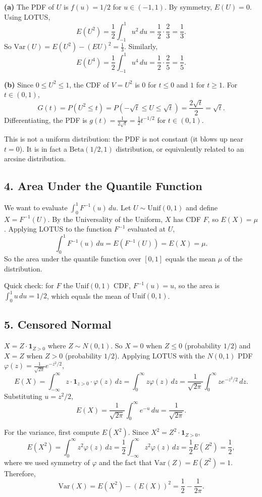 \documentclass{article}
\begin{document}
\textbf{(a)} The PDF of $U$ is $f(u)=1/2$ for $u\in(-1,1)$. By symmetry, $E(U)=0$. Using LOTUS,
$$
E(U^2)=\frac{1}{2}\int_{-1}^{1}u^2\,du=\frac{1}{2}\cdot\frac{2}{3}=\frac{1}{3}.
$$
So $\text{Var}(U)=E(U^2)-(EU)^2=\frac{1}{3}$. Similarly,
$$
E(U^4)=\frac{1}{2}\int_{-1}^{1}u^4\,du=\frac{1}{2}\cdot\frac{2}{5}=\frac{1}{5}.
$$

\textbf{(b)} Since $0\le U^2\le1$, the CDF of $V=U^2$ is $0$ for $t\le0$ and $1$ for $t\ge1$. For $t\in(0,1)$,
$$
G(t)=P(U^2\le t)=P(-\sqrt{t}\le U\le\sqrt{t})=\frac{2\sqrt{t}}{2}=\sqrt{t}.
$$
Differentiating, the PDF is $g(t)=\frac{1}{2\sqrt{t}}=\frac{1}{2}t^{-1/2}$ for $t\in(0,1)$.

This is not a uniform distribution: the PDF is not constant (it blows up near $t=0$). It is in fact a $\text{Beta}(1/2,1)$ distribution, or equivalently related to an arcsine distribution.

\subsection*{4. Area Under the Quantile Function}

We want to evaluate $\int_0^1 F^{-1}(u)\,du$. Let $U\sim\text{Unif}(0,1)$ and define $X=F^{-1}(U)$. By the Universality of the Uniform, $X$ has CDF $F$, so $E(X)=\mu$. Applying LOTUS to the function $F^{-1}$ evaluated at $U$,
$$
\int_0^1 F^{-1}(u)\,du = E(F^{-1}(U)) = E(X) = \mu.
$$
So the area under the quantile function over $[0,1]$ equals the mean $\mu$ of the distribution.

Quick check: for $F$ the $\text{Unif}(0,1)$ CDF, $F^{-1}(u)=u$, so the area is $\int_0^1 u\,du=1/2$, which equals the mean of $\text{Unif}(0,1)$.

\subsection*{5. Censored Normal}

$X = Z\cdot\mathbf{1}_{Z>0}$ where $Z\sim N(0,1)$. So $X=0$ when $Z\le0$ (probability $1/2$) and $X=Z$ when $Z>0$ (probability $1/2$). Applying LOTUS with the $N(0,1)$ PDF $\varphi(z)=\frac{1}{\sqrt{2\pi}}e^{-z^2/2}$,
$$
E(X) = \int_{-\infty}^{\infty}z\cdot\mathbf{1}_{z>0}\cdot\varphi(z)\,dz = \int_0^{\infty}z\varphi(z)\,dz = \frac{1}{\sqrt{2\pi}}\int_0^{\infty}ze^{-z^2/2}\,dz.
$$
Substituting $u=z^2/2$,
$$
E(X) = \frac{1}{\sqrt{2\pi}}\int_0^{\infty}e^{-u}\,du = \frac{1}{\sqrt{2\pi}}.
$$

For the variance, first compute $E(X^2)$. Since $X^2=Z^2\cdot\mathbf{1}_{Z>0}$,
$$
E(X^2) = \int_0^{\infty}z^2\varphi(z)\,dz = \frac{1}{2}\int_{-\infty}^{\infty}z^2\varphi(z)\,dz = \frac{1}{2}E(Z^2) = \frac{1}{2},
$$
where we used symmetry of $\varphi$ and the fact that $\text{Var}(Z)=E(Z^2)=1$. Therefore,
$$
\text{Var}(X) = E(X^2) - (E(X))^2 = \frac{1}{2} - \frac{1}{2\pi}.
$$
\end{document}
